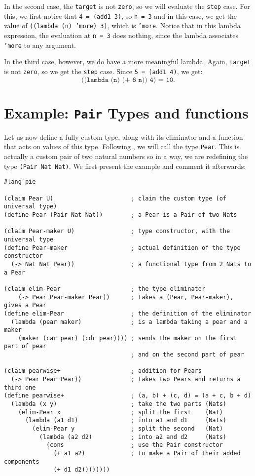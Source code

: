 In the second case, the \texttt{target} is not \texttt{zero}, so we
will evaluate the \texttt{step} case. For this, we first notice that
\texttt{4 = (add1 3)}, so \texttt{n = 3} and in this case, we get
the value of \texttt{((lambda (n) 'more) 3)}, which is \texttt{'more}.
Notice that in this lambda expression, the evaluation at \texttt{n = 3}
does nothing, since the lambda associates \texttt{'more} to any argument.

In the third case, however, we do have a more meaningful lambda.
Again, \texttt{target} is not \texttt{zero}, so we get the \texttt{step}
case. Since \texttt{5 = (add1 4)}, we get:
\[
  \texttt{((lambda (n) (+ 6 n)) 4) = 10}.
\]

\section{Example: \texttt{Pair} Types and functions}
\label{sec:pair-ex}

Let us now define a fully custom type, along with its eliminator
and a function that acts on values of this type. Following
\cite{typer}, we will call the type \texttt{Pear}. This is actually
a custom pair of two natural numbers so in a way, we are redefining
the type \texttt{(Pair Nat Nat)}. We first present the example and
comment it afterwards:
{
  \small
\begin{verbatim}
#lang pie

(claim Pear U)                      ; claim the custom type (of universal type)
(define Pear (Pair Nat Nat))        ; a Pear is a Pair of two Nats

(claim Pear-maker U)                ; type constructor, with the universal type
(define Pear-maker                  ; actual definition of the type constructor
  (-> Nat Nat Pear))                ; a functional type from 2 Nats to a Pear

(claim elim-Pear                    ; the type eliminator
    (-> Pear Pear-maker Pear))      ; takes a (Pear, Pear-maker), gives a Pear
(define elim-Pear                   ; the definition of the eliminator
  (lambda (pear maker)              ; is a lambda taking a pear and a maker
    (maker (car pear) (cdr pear)))) ; sends the maker on the first part of pear
                                    ; and on the second part of pear

(claim pearwise+                    ; addition for Pears
  (-> Pear Pear Pear))              ; takes two Pears and returns a third one
(define pearwise+                   ; (a, b) + (c, d) = (a + c, b + d)
  (lambda (x y)                     ; take the two parts (Nats)
    (elim-Pear x                    ; split the first    (Nat)
      (lambda (a1 d1)               ; into a1 and d1     (Nats)
        (elim-Pear y                ; split the second   (Nat)
          (lambda (a2 d2)           ; into a2 and d2     (Nats)
            (cons                   ; use the Pair constructor
              (+ a1 a2)             ; to make a Pair of their added components
              (+ d1 d2))))))))
\end{verbatim}
}

